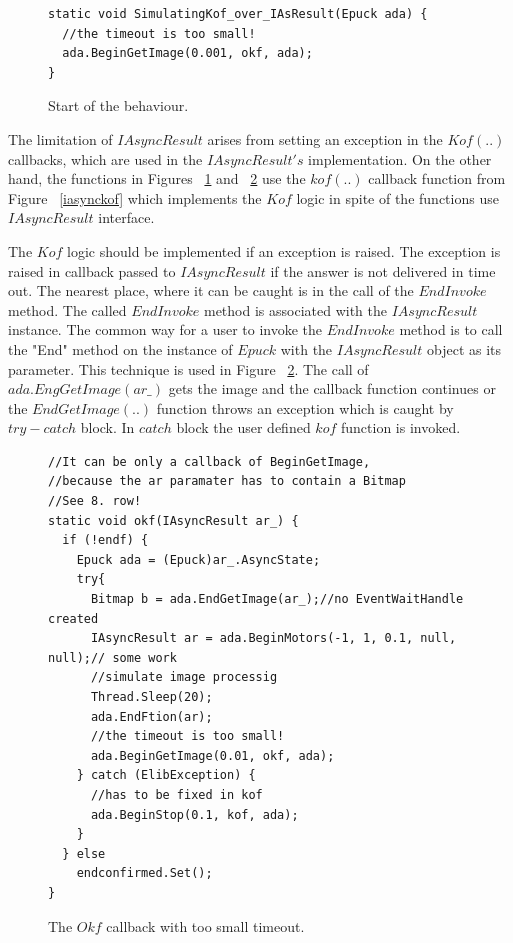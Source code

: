 \begin{figure}[!hbp]
\begin{lstlisting}
static void SimulatingKof_over_IAsResult(Epuck ada) {
  //the timeout is too small!
  ada.BeginGetImage(0.001, okf, ada);
}
\end{lstlisting}
\caption{Start of the behaviour.}
\label{c:start}
\end{figure}

  The limitation of $IAsyncResult$ arises from setting an exception in the $Kof(..)$ callbacks,
  which are used in the $IAsyncResult's$ implementation.
  On the other hand, the functions in Figures ~\ref{c:start} and ~\ref{c:okfsim} use the $kof(..)$ callback function
  from Figure ~\ref{iasynckof} 
  which implements the $Kof$ logic in spite of the functions use $IAsyncResult$ interface.

  The $Kof$ logic should be implemented if an exception is raised. 
  The exception is raised in callback passed to $IAsyncResult$ if the answer is not delivered in time out. 
  The nearest place, where it can be caught is in the call of the $EndInvoke$ method.
  The called $EndInvoke$ method is associated with the $IAsyncResult$ instance. 
  The common way for a user to invoke the $EndInvoke$ method is to call the "End" method 
  on the instance of $Epuck$ with the $IAsyncResult$ object as its parameter. 
  This technique is used in Figure ~\ref{c:okfsim}.
  The call of $ada.EngGetImage(ar\_)$ gets the image and the callback function continues
  or the $EndGetImage(..)$ function throws an exception which is caught by $try-catch$ block.
  In $catch$ block the user defined $kof$ function is invoked.
  
\begin{figure}[!hbp]
\begin{lstlisting}
//It can be only a callback of BeginGetImage,
//because the ar paramater has to contain a Bitmap
//See 8. row!
static void okf(IAsyncResult ar_) {
  if (!endf) {
    Epuck ada = (Epuck)ar_.AsyncState;
    try{
      Bitmap b = ada.EndGetImage(ar_);//no EventWaitHandle created
      IAsyncResult ar = ada.BeginMotors(-1, 1, 0.1, null, null);// some work
      //simulate image processig
      Thread.Sleep(20);
      ada.EndFtion(ar);
      //the timeout is too small!
      ada.BeginGetImage(0.01, okf, ada);
    } catch (ElibException) {
      //has to be fixed in kof
      ada.BeginStop(0.1, kof, ada);
    }
  } else
    endconfirmed.Set();
}
\end{lstlisting}
\caption{The $Okf$ callback with too small timeout.}
\label{c:okfsim}
\end{figure}

